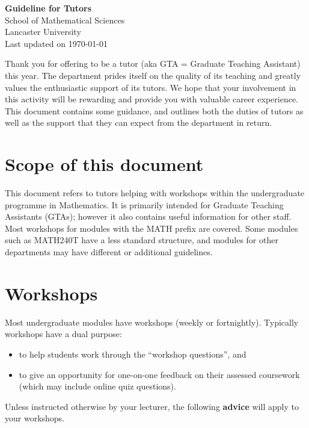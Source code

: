 \documentclass[11pt,a4paper]{amsart}
\begin{document}
\begin{center} 

{\bf \sffamily \Large Guideline for Tutors} \\ 
\vspace{3mm} 
School of Mathematical Sciences \\ 
Lancaster University \\
Last updated on \today \\
\end {center}

\noindent\makebox[\linewidth]{\rule{\textwidth}{0.4pt}}
\vspace{2mm}

Thank you for offering to be a tutor (aka GTA = Graduate Teaching Assistant) this year. The department prides itself on the quality of its teaching and greatly values the enthusiastic support of its tutors. We hope that your involvement in this activity will be rewarding and provide you with valuable career experience. This document contains some guidance, and outlines both the duties of tutors as well as the support that they can expect from the department in return.

\section{Scope of this document}

This document refers to tutors helping with workshops within the undergraduate programme in Mathematics. It is primarily intended for Graduate Teaching Assistants (GTAs); however it also contains useful information for other staff. Most workshops for modules with the MATH prefix are covered. Some modules such as MATH240T have a less standard structure, and modules for other departments may have different or additional guidelines.


\section{Workshops}

Most undergraduate modules have workshops (weekly or fortnightly). Typically workshops have a dual purpose: 
\begin{itemize}
 \item to help students work through the ``workshop questions'', and
 \item to give an opportunity for one-on-one feedback on their assessed coursework (which may include online quiz questions). 
\end{itemize}
Unless instructed otherwise by your lecturer, the following {\bf advice} will apply to your workshops.
\end{document}
